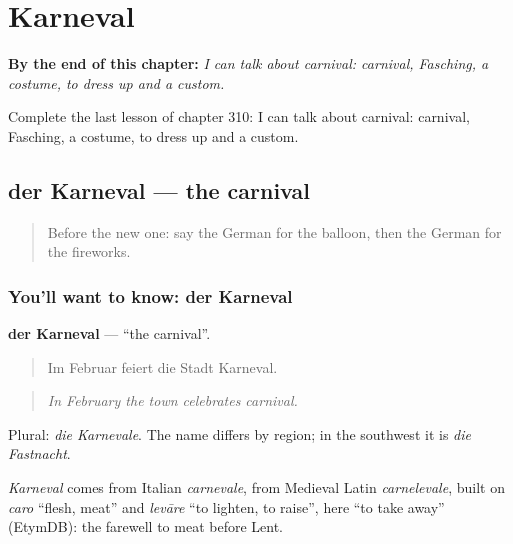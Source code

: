 
\chapter{Karneval}
\label{ch:ge-karneval}

\begin{chapteropening}
\textbf{By the end of this chapter:} \emph{I can talk about carnival: carnival, Fasching, a costume, to dress up and a custom.}

Complete the last lesson of chapter 310: I can talk about carnival: carnival, Fasching, a costume, to dress up and a custom.
\end{chapteropening}

\section[der Karneval]{der Karneval — the carnival}

\label{lesson:GE-C310-karneval}



\begin{quote}
Before the new one: say the German for the balloon, then the German for the fireworks.
\end{quote}

\subsection*{You'll want to know: der Karneval}
\textbf{der Karneval} — \textquotedblleft{}the carnival\textquotedblright{}.

\begin{quote}
Im Februar feiert die Stadt Karneval.
\end{quote}

\begin{quote}
\emph{In February the town celebrates carnival.}
\end{quote}

Plural: \emph{die Karnevale}. The name differs by region; in the southwest it is \emph{die Fastnacht}.

\begin{cousinweb}
\emph{Karneval} comes from Italian \emph{carnevale}, from Medieval Latin \emph{carnelevale}, built on \emph{caro} \textquotedblleft{}flesh, meat\textquotedblright{} and \emph{levāre} \textquotedblleft{}to lighten, to raise\textquotedblright{}, here \textquotedblleft{}to take away\textquotedblright{} (EtymDB): the farewell to meat before Lent.
\end{cousinweb}

